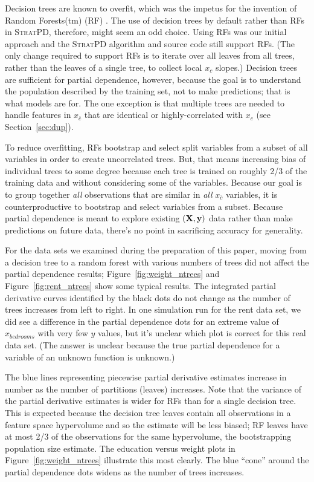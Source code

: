 \documentclass[12pt]{article}
\newcommand{\secref}[1]{Section~\ref{#1}}
\newcommand{\figref}[1]{Figure~\ref{#1}}
\newcommand{\spd}{\fontfamily{cmr}\textsc{\small StratPD}}
\newcommand{\xnc}{$x_{\overline{c}}$}
\begin{document}
Decision trees are known to overfit, which was the impetus for the invention of Random Forests(tm) (RF) \cite{RF}.  The use of decision trees by default rather than RFs in \spd, therefore, might seem an odd choice. Using RFs was our initial approach and the \spd{} algorithm and source code still support RFs. (The only change required to support RFs is to iterate over all leaves from all trees, rather than the leaves of a single tree, to collect local $x_c$ slopes.)  Decision trees are sufficient for partial dependence, however, because the goal is to understand the population described by the training set, not to make predictions; that is what models are for. The one exception is that multiple trees are needed to handle features in \xnc{} that are identical or highly-correlated with $x_c$ (see \secref{sec:dup}).

To reduce overfitting, RFs bootstrap and select split variables from a subset of all variables in order to create uncorrelated trees. But, that means increasing bias of individual trees to some degree because each tree is trained on roughly 2/3 of the training data and without considering some of the variables. Because our goal is to group together {\em all} observations that are similar in {\em all} \xnc{} variables, it is counterproductive to bootstrap and select variables from a subset. Because partial dependence is meant to explore existing $(\bf X, y)$ data rather than make predictions on future data, there's no point in sacrificing accuracy for generality. 

For the data sets we examined during the preparation of this paper, moving from a decision tree to a random forest with various numbers of trees did not affect the partial dependence results; \figref{fig:weight_ntrees} and \figref{fig:rent_ntrees} show some typical results. The integrated partial derivative curves identified by the black dots do not change as the number of trees increases from left to right.  In one simulation run for the rent data set, we did see a difference in the partial dependence dots for an extreme value of $x_{bedrooms}$ with very few $y$ values, but it's unclear which plot is correct for this real data set. (The answer is unclear because the true partial dependence for a variable of an unknown function is unknown.)

The blue lines representing piecewise partial derivative estimates increase in number as the number of partitions (leaves) increases.  Note that the variance of the partial derivative estimates is wider for RFs than for a single decision tree. This is expected because the decision tree leaves contain all observations in a feature space hypervolume and so the estimate will be less biased; RF leaves have at most 2/3 of the observations for the same hypervolume, the bootstrapping population size estimate. The education versus weight plots in \figref{fig:weight_ntrees} illustrate this most clearly. The blue ``cone'' around the partial dependence dots widens as the number of trees increases.  
\end{document}
